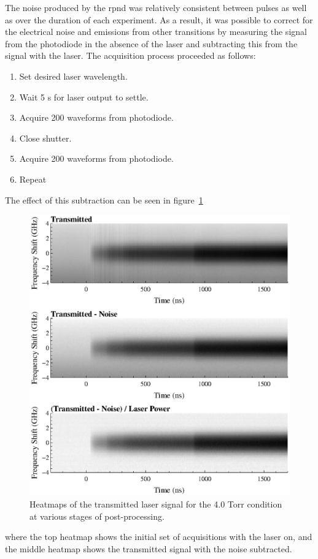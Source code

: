 The noise produced by the \acs{rpnd} was relatively consistent between pulses as
well as over the duration of each experiment. As a result, it was possible to
correct for the electrical noise and emissions from other transitions by
measuring the signal from the photodiode in the absence of the laser and
subtracting this from the signal with the laser. The acquisition process
proceeded as follows:
\begin{enumerate}
  \singlespacing
  \item Set desired laser wavelength.
  \item Wait 5 s for laser output to settle.
  \item Acquire 200 waveforms from photodiode.
  \item Close shutter.
  \item Acquire 200 waveforms from photodiode.
  \item Repeat
\end{enumerate}
The effect of this subtraction can be seen in figure~\ref{fig:contours}
\begin{figure}
  \centering
  \includegraphics{./chapters/metastables/figures/contours.eps}
  \caption{Heatmaps of the transmitted laser signal for the 4.0 Torr condition at 
  various stages of post-processing.}
  \label{fig:contours}
\end{figure}
where the top heatmap shows the initial set of acquisitions with the laser on,
and the middle heatmap shows the transmitted signal with the noise subtracted.

